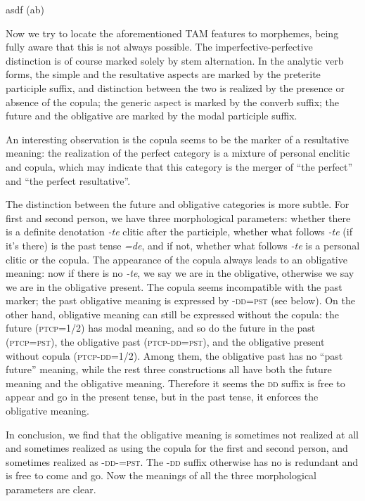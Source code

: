 \documentclass[a4paper, oneside, 12pt]{report}
\newcommand{\form}[1]{\emph{#1}}
\newcommand{\category}[1]{\textsc{#1}}
\newcommand{\source}[1]{\hspace{\fill}\mbox{}\linebreak[0]\hspace*{\fill}\mbox{(\small #1)}}
\begin{document}
\begin{exe}
    \ex asdf \source{ab}
\end{exe}

Now we try to locate the aforementioned TAM features to morphemes, 
being fully aware that this is not always possible. 
The imperfective-perfective distinction is of course marked 
solely by stem alternation.
In the analytic verb forms, 
the simple and the resultative aspects
are marked by the preterite participle suffix, 
and distinction between the two is realized by the 
presence or absence of the copula; 
the generic aspect is marked by the converb suffix; 
the future and the obligative are marked by 
the modal participle suffix.

An interesting observation is the copula seems to be the marker of a resultative meaning: 
the realization of the perfect category 
is a mixture of personal enclitic and copula, 
which may indicate that this category is the merger of ``the perfect'' and ``the perfect resultative''.

The distinction between the future and obligative categories is more subtle.
For first and second person, 
we have three morphological parameters:
whether there is a definite denotation \form{-te} clitic after the participle, 
whether what follows \form{-te} (if it's there) is 
the past tense \form{=de},
and if not, whether what follows \form{-te} is a personal clitic 
or the copula.
The appearance of the copula always leads to an obligative meaning:
now if there is no \form{-te}, 
we say we are in the obligative, 
otherwise we say we are in the obligative present. 
The copula seems incompatible with the past marker;
the past obligative meaning is expressed by -\category{dd}=\category{pst}
(see below).
On the other hand, obligative meaning can still be expressed 
without the copula:
the future (\category{ptcp}=\category{1/2}) has modal meaning, 
and so do the future in the past (\category{ptcp}=\category{pst}),
the obligative past (\category{ptcp}-\category{dd}=\category{pst}), 
and the obligative present without copula (\category{ptcp}-\category{dd}=\category{1/2}).
Among them, the obligative past has no ``past future'' meaning, 
while the rest three constructions all have both the future meaning 
and the obligative meaning.
Therefore it seems the \category{dd} suffix is free to appear and go 
in the present tense, 
but in the past tense, it enforces the obligative meaning.

In conclusion, we find that the obligative meaning is sometimes not realized at all 
and sometimes realized as using the copula for the first and second person,
and sometimes realized as \category{-dd}-\category{=pst}.
The \category{-dd} suffix otherwise has no is redundant and is free to come and go.
Now the meanings of all the three morphological parameters are clear.
\end{document}
